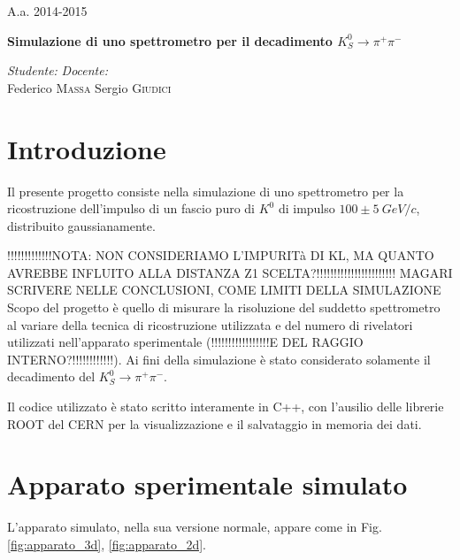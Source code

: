 \documentclass[8pt]{extarticle}
\begin{document}
\label{tab:apparato}\Large{A.a. 2014-2015}
\vspace{10cm}
\begin{center}
\Huge\textbf{Simulazione di uno spettrometro per il decadimento $K^0_S \rightarrow \pi^+ \pi^-$}
\end{center}

\vspace{2cm}
\begin{flushleft}
\medskip
\textit{Studente:} 
\hspace{10 cm}
\textit{Docente:} \\
\medskip
Federico \textsc{Massa}
\hspace{9 cm}
Sergio \textsc{Giudici}
\end{flushleft}



\newpage

\begin{abstract}	
\justify
 
\end{abstract}
\bigskip

\section{Introduzione} \label{sec:intro}
\justify
Il presente progetto consiste nella simulazione di uno spettrometro per la ricostruzione dell'impulso di un fascio puro di $K^0$ di impulso $100 \pm 5 \ GeV/c$, distribuito gaussianamente.
\medskip

!!!!!!!!!!!!!NOTA: NON CONSIDERIAMO L'IMPURITà DI KL, MA QUANTO AVREBBE INFLUITO ALLA DISTANZA Z1 SCELTA?!!!!!!!!!!!!!!!!!!!!!!! MAGARI SCRIVERE NELLE CONCLUSIONI, COME LIMITI DELLA SIMULAZIONE\\

Scopo del progetto è quello di misurare la risoluzione del suddetto spettrometro al variare della tecnica di ricostruzione utilizzata e del numero di rivelatori utilizzati nell'apparato sperimentale (!!!!!!!!!!!!!!!!!E DEL RAGGIO INTERNO?!!!!!!!!!!!!). Ai fini della simulazione è stato considerato solamente il decadimento del $K^0_S \rightarrow \pi^+ \pi^-$. 

Il codice utilizzato è stato scritto interamente in C++, con l'ausilio delle librerie ROOT del CERN per la visualizzazione e il salvataggio in memoria dei dati. \\

\section{Apparato sperimentale simulato} \label{sec:apparato}
L'apparato simulato, nella sua versione normale, appare come in Fig. \ref{fig:apparato_3d}, \ref{fig:apparato_2d}.
\end{document}
